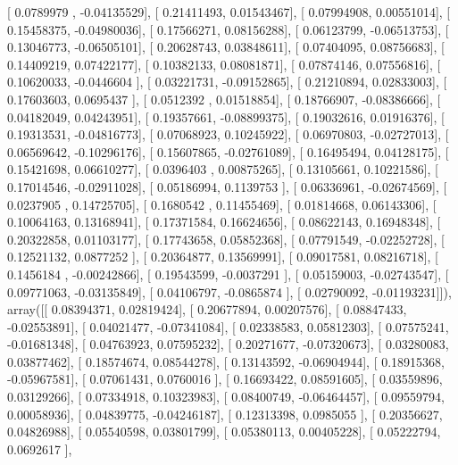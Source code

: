 \documentclass{article}
\begin{document}
       [ 0.0789979 , -0.04135529],
       [ 0.21411493,  0.01543467],
       [ 0.07994908,  0.00551014],
       [ 0.15458375, -0.04980036],
       [ 0.17566271,  0.08156288],
       [ 0.06123799, -0.06513753],
       [ 0.13046773, -0.06505101],
       [ 0.20628743,  0.03848611],
       [ 0.07404095,  0.08756683],
       [ 0.14409219,  0.07422177],
       [ 0.10382133,  0.08081871],
       [ 0.07874146,  0.07556816],
       [ 0.10620033, -0.0446604 ],
       [ 0.03221731, -0.09152865],
       [ 0.21210894,  0.02833003],
       [ 0.17603603,  0.0695437 ],
       [ 0.0512392 ,  0.01518854],
       [ 0.18766907, -0.08386666],
       [ 0.04182049,  0.04243951],
       [ 0.19357661, -0.08899375],
       [ 0.19032616,  0.01916376],
       [ 0.19313531, -0.04816773],
       [ 0.07068923,  0.10245922],
       [ 0.06970803, -0.02727013],
       [ 0.06569642, -0.10296176],
       [ 0.15607865, -0.02761089],
       [ 0.16495494,  0.04128175],
       [ 0.15421698,  0.06610277],
       [ 0.0396403 ,  0.00875265],
       [ 0.13105661,  0.10221586],
       [ 0.17014546, -0.02911028],
       [ 0.05186994,  0.1139753 ],
       [ 0.06336961, -0.02674569],
       [ 0.0237905 ,  0.14725705],
       [ 0.1680542 ,  0.11455469],
       [ 0.01814668,  0.06143306],
       [ 0.10064163,  0.13168941],
       [ 0.17371584,  0.16624656],
       [ 0.08622143,  0.16948348],
       [ 0.20322858,  0.01103177],
       [ 0.17743658,  0.05852368],
       [ 0.07791549, -0.02252728],
       [ 0.12521132,  0.0877252 ],
       [ 0.20364877,  0.13569991],
       [ 0.09017581,  0.08216718],
       [ 0.1456184 , -0.00242866],
       [ 0.19543599, -0.0037291 ],
       [ 0.05159003, -0.02743547],
       [ 0.09771063, -0.03135849],
       [ 0.04106797, -0.0865874 ],
       [ 0.02790092, -0.01193231]]), array([[ 0.08394371,  0.02819424],
       [ 0.20677894,  0.00207576],
       [ 0.08847433, -0.02553891],
       [ 0.04021477, -0.07341084],
       [ 0.02338583,  0.05812303],
       [ 0.07575241, -0.01681348],
       [ 0.04763923,  0.07595232],
       [ 0.20271677, -0.07320673],
       [ 0.03280083,  0.03877462],
       [ 0.18574674,  0.08544278],
       [ 0.13143592, -0.06904944],
       [ 0.18915368, -0.05967581],
       [ 0.07061431,  0.0760016 ],
       [ 0.16693422,  0.08591605],
       [ 0.03559896,  0.03129266],
       [ 0.07334918,  0.10323983],
       [ 0.08400749, -0.06464457],
       [ 0.09559794,  0.00058936],
       [ 0.04839775, -0.04246187],
       [ 0.12313398,  0.0985055 ],
       [ 0.20356627,  0.04826988],
       [ 0.05540598,  0.03801799],
       [ 0.05380113,  0.00405228],
       [ 0.05222794,  0.0692617 ],
\end{document}
